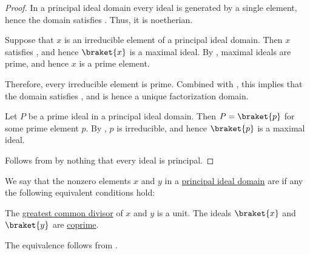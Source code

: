 \begin{proof}
   In a principal ideal domain every ideal is generated by a single element, hence the domain satisfies . Thus, it is noetherian.

   Suppose that \( x \) is an irreducible element of a principal ideal domain. Then \( x \) satisfies , and hence \( \braket{ x } \) is a maximal ideal. By , maximal ideals are prime, and hence \( x \) is a prime element.

  Therefore, every irreducible element is prime. Combined with , this implies that the domain satisfies , and is hence a unique factorization domain.

   Let \( P \) be a prime ideal in a principal ideal domain. Then \( P = \braket{ p } \) for some prime element \( p \). By , \( p \) is irreducible, and hence \( \braket{ p } \) is a maximal ideal.

   Follows from  by nothing that every ideal is principal.
\end{proof}

\begin{definition}\label{def:coprime_elements}\mimprovised
  We say that the nonzero elements \( x \) and \( y \) in a \hyperref[def:principal_ideal_domain]{principal ideal domain} are  if any the following equivalent conditions hold:
  \begin{thmenum}
     The \hyperref[def:gcd_and_lcm]{greatest common divisor} of \( x \) and \( y \) is a unit.
     The ideals \( \braket{ x } \) and \( \braket{ y } \) are \hyperref[def:semiring_ideal/coprime]{coprime}.
  \end{thmenum}
\end{definition}
\begin{defproof}
  The equivalence follows from .
\end{defproof}

